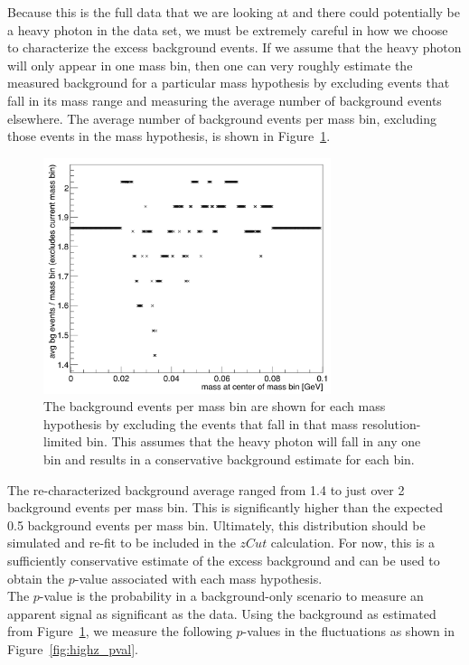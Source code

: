 \indent Because this is the full data that we are looking at and there could potentially be a heavy photon in the data set, we must be extremely careful in how we choose to characterize the excess background events. If we assume that the heavy photon will only appear in one mass bin, then one can very roughly estimate the measured background for a particular mass hypothesis by excluding events that fall in its mass range and measuring the average number of background events elsewhere. The average number of background events per mass bin, excluding those events in the mass hypothesis, is shown in Figure~\ref{fig:highz_newbg}.
\begin{figure}[htb]
  \centering
      \includegraphics[width=0.75\textwidth]{pics/results/highz_avgBG.png}
  \caption[Re-characterization of the excess background]{The background events per mass bin are shown for each mass hypothesis by excluding the events that fall in that mass resolution-limited bin. This assumes that the heavy photon will fall in any one bin and results in a conservative background estimate for each bin.}
  \label{fig:highz_newbg}
\end{figure} 
The re-characterized background average ranged from 1.4 to just over 2 background events per mass bin. This is significantly higher than the expected 0.5 background events per mass bin. Ultimately, this distribution should be simulated and re-fit to be included in the $zCut$ calculation. For now, this is a sufficiently conservative estimate of the excess background and can be used to obtain the $p$-value associated with each mass hypothesis. \\
\indent The $p$-value is the probability in a background-only scenario to measure an apparent signal as significant as the data. Using the background as estimated from Figure~\ref{fig:highz_newbg}, we measure the following $p$-values in the fluctuations as shown in Figure~\ref{fig:highz_pval}.
